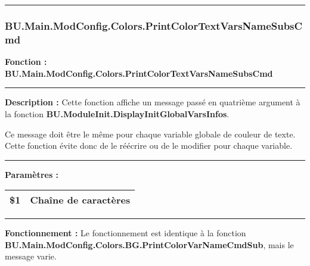 \documentclass[a4paper,10pt]{article}
\begin{document}


\color{sec3}\par\noindent\rule{\textwidth}{0.4pt}\color{text}

\color{sec3}
\subsubsection{BU.Main.ModConfig.Colors.PrintColorTextVarsNameSubsCmd}\color{text}

\begin{justify}
    \textbf{Fonction : \color{func}BU.Main.ModConfig.Colors.PrintColorTextVarsNameSubsCmd}
\end{justify}


\par\noindent\rule{\textwidth}{0.4pt}

\begin{justify}
    \textbf{Description :} Cette fonction affiche un message passé en quatrième argument à la fonction \textbf{\color{func}BU.ModuleInit.DisplayInitGlobalVarsInfos}.
\end{justify}

\begin{justify}
    Ce message doit être le même pour chaque variable globale de couleur de texte. Cette fonction évite donc de le réécrire ou de le modifier pour chaque variable.
\end{justify}


\par\noindent\rule{\textwidth}{0.4pt}

\begin{justify}
    \textbf{Paramètres :}

    \begin{tabular}{|l|l|}
        \hline
        \textbf{\color{vars}\$1} & Chaîne de caractères\\
        \hline
    \end{tabular}
\end{justify}


\par\noindent\rule{\textwidth}{0.4pt}

\begin{justify}
    \textbf{Fonctionnement :} Le fonctionnement est identique à la fonction \textbf{\color{func}BU.Main.ModConfig.Colors.BG.PrintColorVarNameCmdSub}, mais le message varie.
\end{justify}
\end{document}
